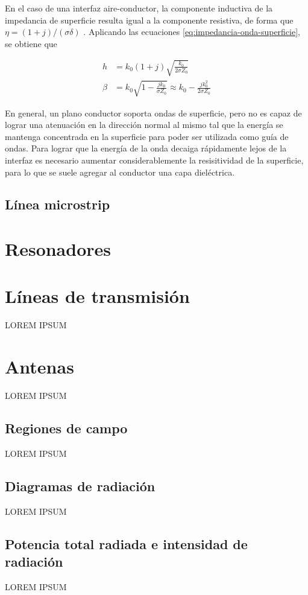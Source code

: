En el caso de una interfaz aire-conductor, la componente inductiva de la impedancia de superficie resulta igual a la componente resistiva, de forma que $\eta = (1+j)/(\sigma \delta)$ \cite{Fernandez:Electromag}. Aplicando las ecuaciones \ref{eq:impedancia-onda-superficie}, se obtiene que

\begin{align}
	h &= k_0 (1+j) \sqrt{\frac{k_0}{2 \sigma Z_0}} \\
	\beta &= k_0 \sqrt{1-\frac{j k_0}{\sigma Z_0}} \approx k_0 - \frac{j k_0^2}{2 \sigma Z_0}
\end{align}

En general, un plano conductor soporta ondas de superficie, pero no es capaz de lograr una atenuación en la dirección normal al mismo tal que la energía se mantenga concentrada en la superficie para poder ser utilizada como guía de ondas. Para lograr que la energía de la onda decaiga rápidamente lejos de la interfaz es necesario aumentar considerablemente la resisitividad de la superficie, para lo que se suele agregar al conductor una capa dieléctrica.
\subsection{Línea microstrip}

\section{Resonadores}

\section{Líneas de transmisión}
\label{subsec_lineas_de_transmision}
LOREM IPSUM
\section{Antenas}
\label{subsec_antenas}
LOREM IPSUM
\subsection{Regiones de campo}
\label{subsubsec_regiones_de_campo}
LOREM IPSUM
\subsection{Diagramas de radiación}
\label{subsubsec_diag_de_rad}
LOREM IPSUM
\subsection{Potencia total radiada e intensidad de radiación}
\label{subsubsec_pot_total_radiada}
LOREM IPSUM
